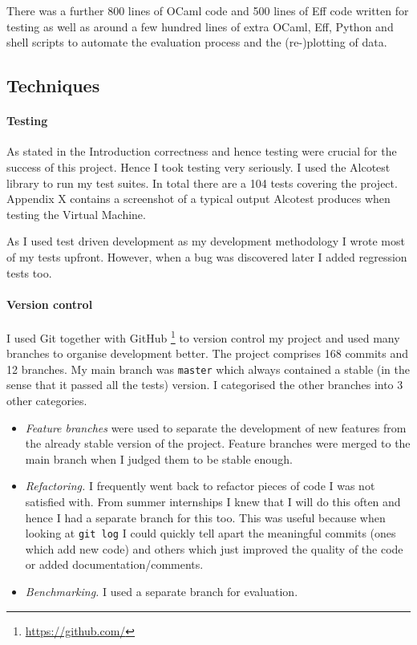 \documentclass[class=article, crop=false]{standalone}
\begin{document}
There was a further 800 lines of OCaml code and 500 lines of Eff code written
for testing as well as around a few hundred lines of extra OCaml, Eff, Python
and shell scripts to automate the evaluation process and the (re-)plotting of
data.


\subsection{Techniques}
\paragraph{Testing}

As stated in the Introduction correctness and hence testing were crucial for
the success of this project. Hence I took testing very seriously. I used the
Alcotest library to run my test suites. In total there are a 104 tests covering
the project. Appendix X contains a screenshot of a typical output Alcotest
produces when testing the Virtual Machine.

As I used test driven development as my development methodology I wrote most of
my tests upfront. However, when a bug was discovered later I added regression
tests too.

\paragraph{Version control}

I used Git together with GitHub
\footnote{\url{https://github.com/}}
to version control my project and used many branches to organise development
better. The project comprises 168 commits and 12 branches.
My main branch was \verb|master| which always contained a stable (in
the sense that it passed all the tests) version. I categorised the other
branches into 3 other categories.

\begin{itemize}
\item
\emph{Feature branches} were used to separate the development of new
features from the already stable version of the project. Feature branches were 
merged to the main branch when I judged them to be stable enough.

\item 
\emph{Refactoring.} I frequently went back to refactor pieces of code I was
not satisfied with. From summer internships I knew that I will do this often
and hence I had a separate branch for this too. This was useful because when
looking at \verb|git log| I could quickly tell apart the meaningful commits
(ones which add new code) and others which just improved the quality of the
code or added documentation/comments.

\item
\emph{Benchmarking.} I used a separate branch for evaluation.
\end{itemize}
\end{document}
